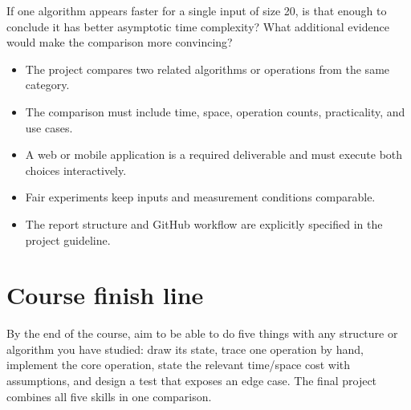 \begin{quickcheck}
If one algorithm appears faster for a single input of size 20, is that enough to conclude it has better asymptotic time complexity? What additional evidence would make the comparison more convincing?
\end{quickcheck}

\begin{chapterrecap}
\begin{itemize}
  \item The project compares two related algorithms or operations from the same category.
  \item The comparison must include time, space, operation counts, practicality, and use cases.
  \item A web or mobile application is a required deliverable and must execute both choices interactively.
  \item Fair experiments keep inputs and measurement conditions comparable.
  \item The report structure and GitHub workflow are explicitly specified in the project guideline.
\end{itemize}
\end{chapterrecap}

\section*{Course finish line}

\begin{recommendedworkflow}
By the end of the course, aim to be able to do five things with any structure or algorithm you have studied: draw its state, trace one operation by hand, implement the core operation, state the relevant time/space cost with assumptions, and design a test that exposes an edge case. The final project combines all five skills in one comparison.
\end{recommendedworkflow}
